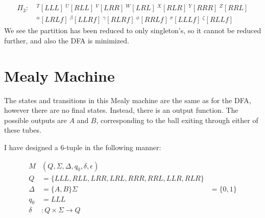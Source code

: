 \documentclass{scrartcl}
\begin{document}
\begin{align*}
\Pi_3 :\ &^T[LLL]\ 
           ^U[RLL]\
           ^V[LRR]\
           ^W[LRL]\ 
           ^X[RLR]\
           ^Y[RRR]\
           ^Z[RRL]\\
    &  ^\alpha[LRLf]\
        ^\beta[LLRf]\
       ^\gamma[RLRf]\
        ^\phi[RRLf]\
       ^\sigma[LLLf]\
        ^\zeta[RLLf]
\end{align*}
We see the partition has been reduced to only singleton's, so it cannot be
reduced further, and also the DFA is minimized.\pagebreak


\section{Mealy Machine}
The states and transitions in this Mealy machine are the same as for the DFA,
however there are no final states. Instead, there is an output function. The
possible outputs are $A$ and $B$, corresponding to the ball exiting through
either of these tubes.

I have designed a 6-tuple in the following manner:

\begin{align*}
M      &(Q,\Sigma,\Delta,q_0,\delta,\epsilon)\\
Q      &= \{LLL,RLL,LRR,LRL,RRR,RRL,LLR,RLR\}\\
\Delta &= \{A,B\}
\Sigma &= \{0,1\}\\
q_0    &= LLL\\
\delta &: Q \times \Sigma \rightarrow Q
\end{align*}
\end{document}
